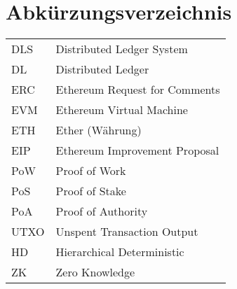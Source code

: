 
\section{Abkürzungsverzeichnis}

\begin{longtable}{p{6 cm}p{9 cm}}
    DLS & Distributed Ledger System \\
    DL & Distributed Ledger \\
    ERC & Ethereum Request for Comments \\
    EVM & Ethereum Virtual Machine \\
    ETH & Ether (Währung) \\
    EIP & Ethereum Improvement Proposal \\
    PoW & Proof of Work \\
    PoS & Proof of Stake \\
    PoA & Proof of Authority \\
    UTXO & Unspent Transaction Output \\
    HD & Hierarchical Deterministic \\
    ZK & Zero Knowledge \\
\end{longtable}

   